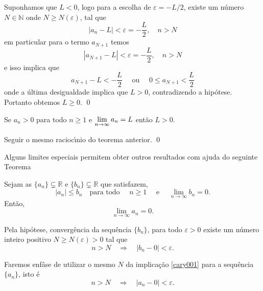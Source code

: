\prova Suponhamos que $L<0$, logo para a escolha de $\varepsilon=-L/2$, existe um n\'{u}mero $N\in \mathbb{N}$ onde $N\geq N(\varepsilon)$, tal que
\begin{equation*}
    |a_n-L|<\varepsilon= -\frac{L}{2},\quad n>N
\end{equation*}
em particular para o termo $a_{N+1}$ temos
\begin{equation*}
    |a_{N+1}-L|<\varepsilon = -\frac{L}{2},\quad n>N
\end{equation*}
e isso implica que
\begin{equation*}
    a_{N+1}-L<-\frac{L}{2}\quad\text{ ou }\quad 0\leq a_{N+1}<\frac{L}{2}
\end{equation*}
onde a \'{u}ltima desigualdade implica que $L>0$, contradizendo a hip\'{o}tese. Portanto obtemos $L\geq 0$. \qed

\begin{coro}
Se $a_n>0$ para todo $n\geq 1$ e $\displaystyle{\lim_{n\to \infty}a_n=L}$ ent\~{a}o $L>0$.
\end{coro}

\prova Seguir o mesmo racioc\'{\i}nio do teorema anterior. \qed

Alguns limites especiais permitem obter outros resultados com ajuda
do seguinte Teorema
\begin{fteo}[Compara\c{c}\~{a}o]
Sejam as \seqs $\{a_n\}\subsetneq \mathbb{R}$ e $\{b_n\}\subsetneq
\mathbb{R}$ que satisfazem,
\begin{equation*}
|a_n|\leq b_n\quad \text{para todo }\quad n\geq 1 \quad\text{ e }
\quad \lim_{n\to\infty} b_{n}=0.
\end{equation*}
Ent\~{a}o,
\begin{equation*}
\lim_{n\to\infty} a_{n}=0.  
\end{equation*}
\end{fteo}

\prova Pela hip\'{o}tese, converg\^{e}ncia da sequ\^{e}ncia $\{b_n\}$, para todo $\varepsilon>0$ existe um n\'{u}mero inteiro positivo $N \geq N(\varepsilon)>0$ tal que
\begin{equation}\label{cary001}
    n>N \quad \Rightarrow \quad |b_n-0|<\varepsilon.
\end{equation}

Faremos enf\^{a}se de utilizar o mesmo $N$ da implica\c{c}\~{a}o \eqref{cary001} para a sequ\^{e}ncia $\{ a_n\}$, isto \'{e}
\begin{equation}\label{cary002}
    n>N \quad \Rightarrow \quad |a_n-0|<\varepsilon.
\end{equation}


